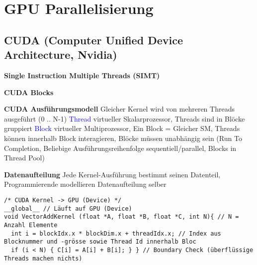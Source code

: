 \section{GPU Parallelisierung}

\subsection{CUDA (Computer Unified Device Architecture, Nvidia)}

\textbf{Single Instruction Multiple Threads (SIMT)}

\textbf{CUDA Blocks}

\textbf{CUDA Ausführungsmodell} Gleicher Kernel wird von mehreren Threads ausgeführt (0 .. N-1) \textcolor{blue}{Thread} virtueller Skalarprozessor, Threads sind in Blöcke gruppiert \textcolor{blue}{Block} virtueller Multiprozessor, Ein Block = Gleicher SM, Threads können innerhalb Block interagieren, Blöcke müssen unabhängig sein (Run To Completion, Beliebige Ausführungsreihenfolge sequentiell/parallel, Blocks in Thread Pool)

\textbf{Datenaufteilung} Jede Kernel-Ausführung bestimmt seinen Datenteil, Programmierende modellieren Datenaufteilung selber

\begin{lstlisting}
/* CUDA Kernel -> GPU (Device) */
__global__ // Läuft auf GPU (Device)
void VectorAddKernel (float *A, float *B, float *C, int N){ // N = Anzahl Elemente
  int i = blockIdx.x * blockDim.x + threadIdx.x; // Index aus Blocknummer und -grösse sowie Thread Id innerhalb Bloc
  if (i < N) { C[i] = A[i] + B[i]; } } // Boundary Check (überflüssige Threads machen nichts)
\end{lstlisting}

